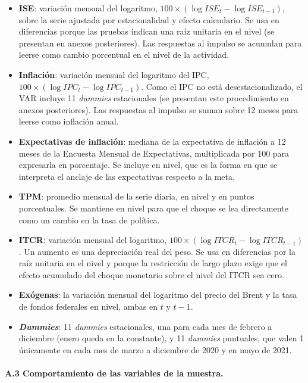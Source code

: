 \documentclass[12pt,letterpaper]{article}
\newcommand{\rutacuadros}{cuadros/}
\newcommand{\cuadro}[1]{}
\begin{document}
\begin{itemize}
\item \textbf{ISE}: variación mensual del logaritmo, $100 \times (\log ISE_t - \log ISE_{t-1})$, sobre la serie ajustada por estacionalidad y efecto calendario. Se usa en diferencias porque las pruebas indican una raíz unitaria en el nivel (se presentan en anexos posteriores). Las respuestas al impulso se acumulan para leerse como cambio porcentual en el nivel de la actividad.
\item \textbf{Inflación}: variación mensual del logaritmo del IPC, $100 \times (\log IPC_t - \log IPC_{t-1})$. Como el IPC no está desestacionalizado, el VAR incluye 11 \textit{dummies} estacionales (se presentan este procedimiento en anexos posteriores). Las respuestas al impulso se suman sobre 12 meses para leerse como inflación anual.
\item \textbf{Expectativas de inflación}: mediana de la expectativa de inflación a 12 meses de la Encuesta Mensual de Expectativas, multiplicada por 100 para expresarla en porcentaje. Se incluye en nivel, que es la forma en que se interpreta el anclaje de las expectativas respecto a la meta.
\item \textbf{TPM}: promedio mensual de la serie diaria, en nivel y en puntos porcentuales. Se mantiene en nivel para que el choque se lea directamente como un cambio en la tasa de política.
\item \textbf{ITCR}: variación mensual del logaritmo, $100 \times (\log ITCR_t - \log ITCR_{t-1})$. Un aumento es una depreciación real del peso. Se usa en diferencias por la raíz unitaria en el nivel y porque la restricción de largo plazo exige que el efecto acumulado del choque monetario sobre el nivel del ITCR sea cero.
\item \textbf{Exógenas}: la variación mensual del logaritmo del precio del Brent y la tasa de fondos federales en nivel, ambas en $t$ y $t-1$.
\item \textbf{\textit{Dummies}}: 11 \textit{dummies} estacionales, una para cada mes de febrero a diciembre (enero queda en la constante), y 11 \textit{dummies} puntuales, que valen 1 únicamente en cada mes de marzo a diciembre de 2020 y en mayo de 2021.
\end{itemize}

\cuadro{cuadro_transformaciones}

\paragraph{A.3 Comportamiento de las variables de la muestra.} 
\end{document}
